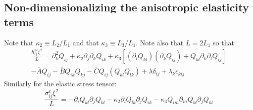 \documentclass[reqno]{article}
\begin{document}
	\subsection{Non-dimensionalizing the anisotropic elasticity terms}
	Note that $\kappa_2 \equiv L_2 / L_1$ and that $\kappa_3 \equiv L_3 / L_1$. Note also that $L = 2 L_1$ so that
	\begin{multline}
		\frac{h^{he}_{ij} \xi^2}{L} =
		\partial_k^2 Q_{ij}
		+ \kappa_2 \partial_j \partial_k Q_{ik}
		+ \kappa_3 \left[
		\left(\partial_l Q_{kl}\right)
		\left(\partial_k Q_{ij}\right)
		+ Q_{kl} \partial_k \partial_l Q_{ij}
		\right] \\
		- \overline{A} Q_{ij}
		- \overline{B} Q_{ik} Q_{kj}
		- \overline{C} Q_{ij} \left( Q_{kl} Q_{lk} \right)
		+ \lambda \delta_{ij}
		+ \lambda_k \epsilon_{kij}
	\end{multline}
	Similarly for the elastic stress tensor:
	\begin{equation}
		\frac{\sigma^e_{ij} \xi^2}{L} =
		- \partial_i Q_{kl} \partial_j Q_{kl}
		- \kappa_2 \partial_l Q_{lk} \partial_j Q_{ik}
		- \kappa_3 Q_{im} \partial_m Q_{kl} \partial_j Q_{kl}
	\end{equation}
	
\end{document}
